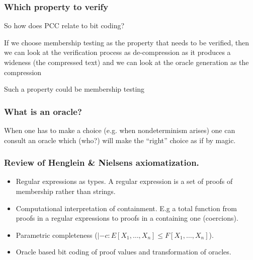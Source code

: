 \documentclass[slidestop,compress,mathserif, xcolor=table]{beamer}
\begin{document}
\begin{frame}
  \frametitle{Which property to verify}
  
  So how does PCC relate to bit coding?

  If we choose membership testing as the property that needs to be verified,
  then we can look at the verification process as de-compression as it produces a
  wideness (the compressed text) and we can look at the oracle generation as the
  compression 
  
  Such a property could be membership testing
  
\end{frame}

\begin{frame}
  \frametitle{What is an oracle?}
  When one has to make a choice (e.g. when nondeterminism arises) one can
  consult an oracle which (who?) will make the ``right'' choice as if by magic.
\end{frame}

\begin{frame}
  \frametitle{Review of Henglein \& Nielsens axiomatization.}
  \begin{itemize}
  \item Regular expressions as types. A regular expression is a set of proofs of
    membership rather than strings.
  \item Computational interpretation of containment. E.g a total function from
    proofs in a regular expressions to proofs in a containing one (coercions).
  \item Parametric completeness ($|- c : E[X_1, \ldots, X_n] \leq F[X_1,
    \ldots, X_n]$).
  \item Oracle based bit coding of proof values and transformation of oracles.
  \end{itemize}
\end{frame}
\end{document}
